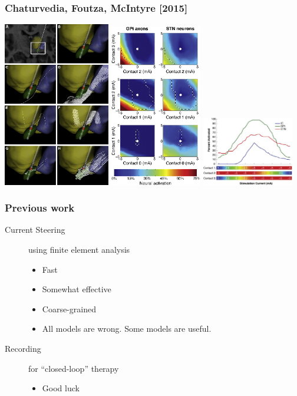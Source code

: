 \documentclass{beamer}
\begin{document}
\begin{frame}
  \frametitle{Chaturvedia, Foutza, McIntyre [2015]}
  \includegraphics[width=0.35\textwidth]{chaturvedi-steering-0}
  \includegraphics[width=0.3\textwidth]{chaturvedi-steering-1}
  \includegraphics[width=0.3\textwidth]{chaturvedi-steering-2}
\end{frame}


\begin{frame}
  \frametitle{Previous work}
  \begin{description}
  \item[Current Steering] using finite element analysis
    \begin{itemize}
    \item Fast
    \item Somewhat effective
    \item Coarse-grained
    \item All models are wrong.  Some models are useful.
    \end{itemize}
  \item[Recording] for ``closed-loop'' therapy
    \begin{itemize}
    \item Good luck
    \end{itemize}
  \end{description}
\end{frame}
\end{document}
